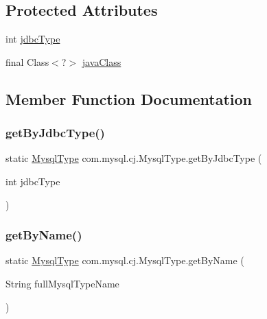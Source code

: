 \subsection*{Protected Attributes}
\begin{DoxyCompactItemize}
\item 
int \mbox{\hyperlink{enumcom_1_1mysql_1_1cj_1_1_mysql_type_aca13b73fe3014af5bc1c568024fd1063}{jdbc\+Type}}
\item 
final Class$<$?$>$ \mbox{\hyperlink{enumcom_1_1mysql_1_1cj_1_1_mysql_type_acc498b3cc7c6fbb8dc86b72b60db102d}{java\+Class}}
\end{DoxyCompactItemize}


\subsection{Member Function Documentation}
\mbox{\label{enumcom_1_1mysql_1_1cj_1_1_mysql_type_ae37670e80313760fd00c339a1a6061cd}} 
\subsubsection{\texorpdfstring{get\+By\+Jdbc\+Type()}{getByJdbcType()}}
{\footnotesize\ttfamily static \mbox{\hyperlink{enumcom_1_1mysql_1_1cj_1_1_mysql_type}{Mysql\+Type}} com.\+mysql.\+cj.\+Mysql\+Type.\+get\+By\+Jdbc\+Type (\begin{DoxyParamCaption}\item[{int}]{jdbc\+Type }\end{DoxyParamCaption})\hspace{0.3cm}{\ttfamily [static]}}

\mbox{\label{enumcom_1_1mysql_1_1cj_1_1_mysql_type_a3f47c0e41170018df1c9bd922c33ed40}} 
\subsubsection{\texorpdfstring{get\+By\+Name()}{getByName()}}
{\footnotesize\ttfamily static \mbox{\hyperlink{enumcom_1_1mysql_1_1cj_1_1_mysql_type}{Mysql\+Type}} com.\+mysql.\+cj.\+Mysql\+Type.\+get\+By\+Name (\begin{DoxyParamCaption}\item[{String}]{full\+Mysql\+Type\+Name }\end{DoxyParamCaption})\hspace{0.3cm}{\ttfamily [static]}}

